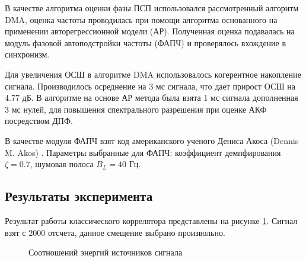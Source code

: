 В качестве алгоритма оценки фазы ПСП использовался
рассмотренный алгоритм DMA, оценка частоты проводилась при помощи алгоритма основанного на применении авторегрессионной модели (АР).
Полученная оценка подавалась на модуль фазовой автоподстройки частоты (ФАПЧ) и проверялось вхождение в синхронизм.

Для увеличения ОСШ в алгоритме DMA использовалось когерентное накопление сигнала. Производилось осреднение на 3 мс сигнала, что дает прирост ОСШ на 4.77 дБ.
В алгоритме на основе АР метода была взята 1 мс сигнала дополненная 3 мс нулей, для повышения спектрального разрешения при оценке АКФ посредством ДПФ.

В качестве модуля ФАПЧ взят код американского ученого Дениса Акоса (Dennis M. Akos) \cite{sandiaproject}.
Параметры выбранные для ФАПЧ: коэффициент демпфирования ${\zeta=0.7}$, шумовая полоса  ${B_L=40}$ Гц. 

\subsection{Результаты эксперимента}

Результат работы классического коррелятора представлены на рисунке \ref{pic:5mhz_sats_all}. Сигнал взят с 2000 отсчета, данное смещение выбрано произвольно.
\begin{figure}[h]
\center{}
	\caption{Соотношений энергий источников сигнала}
	\label{pic:5mhz_sats_all}
\end{figure}

